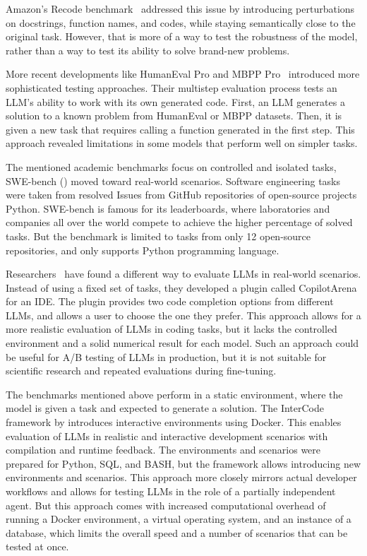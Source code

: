 Amazon's Recode benchmark~\cite{recode_wang2022} addressed this issue by introducing perturbations on docstrings, function names, and codes, while staying semantically close to the original task.
However, that is more of a way to test the robustness of the model, rather than a way to test its ability to solve brand-new problems.

More recent developments like HumanEval Pro and MBPP Pro~\cite{yu2024humanevalprombpppro} introduced more sophisticated testing approaches.
Their multistep evaluation process tests an LLM's ability to work with its own generated code.
First, an LLM generates a solution to a known problem from HumanEval or MBPP datasets.
Then, it is given a new task that requires calling a function generated in the first step.
This approach revealed limitations in some models that perform well on simpler tasks.

The mentioned academic benchmarks focus on controlled and isolated tasks, SWE-bench (\cite{jimenez2024swebenchlanguagemodelsresolve}) moved toward real-world scenarios.
Software engineering tasks were taken from resolved Issues from GitHub repositories of open-source projects Python.
SWE-bench is famous for its leaderboards, where laboratories and companies all over the world compete to achieve the higher percentage of solved tasks.
But the benchmark is limited to tasks from only 12 open-source repositories, and only supports Python programming language.

Researchers~\cite{chi2025copilotarenaplatformcode} have found a different way to evaluate LLMs in real-world scenarios.
Instead of using a fixed set of tasks, they developed a plugin called CopilotArena for an IDE.
The plugin provides two code completion options from different LLMs, and allows a user to choose the one they prefer.
This approach allows for a more realistic evaluation of LLMs in coding tasks, but it lacks the controlled environment and a solid numerical result for each model.
Such an approach could be useful for A/B testing of LLMs in production, but it is not suitable for scientific research and repeated evaluations during fine-tuning.

The benchmarks mentioned above perform in a static environment, where the model is given a task and expected to generate a solution.
The InterCode framework by\cite{yang2023intercodestandardizingbenchmarkinginteractive} introduces interactive environments using Docker.
This enables evaluation of LLMs in realistic and interactive development scenarios with compilation and runtime feedback.
The environments and scenarios were prepared for Python, SQL, and BASH, but the framework allows introducing new environments and scenarios.
This approach more closely mirrors actual developer workflows and allows for testing LLMs in the role of a partially independent agent.
But this approach comes with increased computational overhead of running a Docker environment, a virtual operating system, and an instance of a database, which limits the overall speed and a number of scenarios that can be tested at once.


